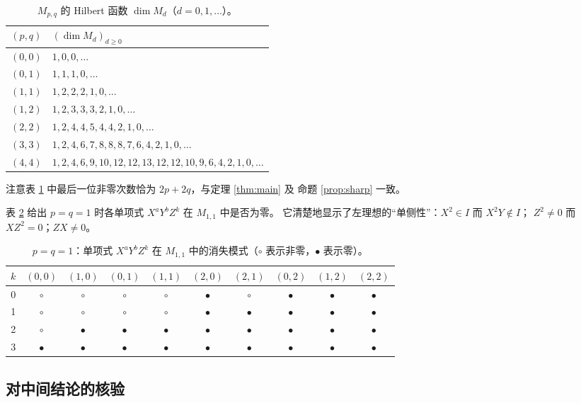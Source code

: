\documentclass[11pt,UTF8]{ctexart}
\theoremstyle{definition}
\begin{document}
\begin{table}[htbp]
\centering
\caption{$M_{p,q}$ 的 Hilbert 函数 $\dim M_d$（$d=0,1,\dots$）。}
\label{tab:hilbert}
\begin{tabular}{c|l}
\toprule
$(p,q)$ & $(\dim M_d)_{d\ge0}$\\
\midrule
$(0,0)$ & $1,0,0,\dots$\\
$(0,1)$ & $1,1,1,0,\dots$\\
$(1,1)$ & $1,2,2,2,1,0,\dots$\\
$(1,2)$ & $1,2,3,3,3,2,1,0,\dots$\\
$(2,2)$ & $1,2,4,4,5,4,4,2,1,0,\dots$\\
$(3,3)$ & $1,2,4,6,7,8,8,8,7,6,4,2,1,0,\dots$\\
$(4,4)$ & $1,2,4,6,9,10,12,12,13,12,12,10,9,6,4,2,1,0,\dots$\\
\bottomrule
\end{tabular}
\end{table}

注意表 \ref{tab:hilbert} 中最后一位非零次数恰为 $2p+2q$，与定理 \ref{thm:main} 及
命题 \ref{prop:sharp} 一致。

表 \ref{tab:mono} 给出 $p=q=1$ 时各单项式 $X^aY^bZ^k$ 在 $M_{1,1}$ 中是否为零。
它清楚地显示了左理想的“单侧性”：$X^2\in I$ 而 $X^2Y\notin I$；
$Z^2\ne0$ 而 $XZ^2=0$；$ZX\ne0$。

\begin{table}[htbp]
\centering
\caption{$p=q=1$：单项式 $X^aY^bZ^k$ 在 $M_{1,1}$ 中的消失模式（$\circ$ 表示非零，$\bullet$ 表示零）。}
\label{tab:mono}
\begin{tabular}{c|ccccccccc}
\toprule
$k$ & $(0,0)$ & $(1,0)$ & $(0,1)$ & $(1,1)$ & $(2,0)$ & $(2,1)$ & $(0,2)$ & $(1,2)$ & $(2,2)$\\
\midrule
0 & $\circ$ & $\circ$ & $\circ$ & $\circ$ & $\bullet$ & $\circ$ & $\bullet$ & $\bullet$ & $\bullet$\\
1 & $\circ$ & $\circ$ & $\circ$ & $\circ$ & $\bullet$ & $\bullet$ & $\bullet$ & $\bullet$ & $\bullet$\\
2 & $\circ$ & $\bullet$ & $\bullet$ & $\bullet$ & $\bullet$ & $\bullet$ & $\bullet$ & $\bullet$ & $\bullet$\\
3 & $\bullet$ & $\bullet$ & $\bullet$ & $\bullet$ & $\bullet$ & $\bullet$ & $\bullet$ & $\bullet$ & $\bullet$\\
\bottomrule
\end{tabular}
\end{table}

\subsection{对中间结论的核验}
\end{document}
